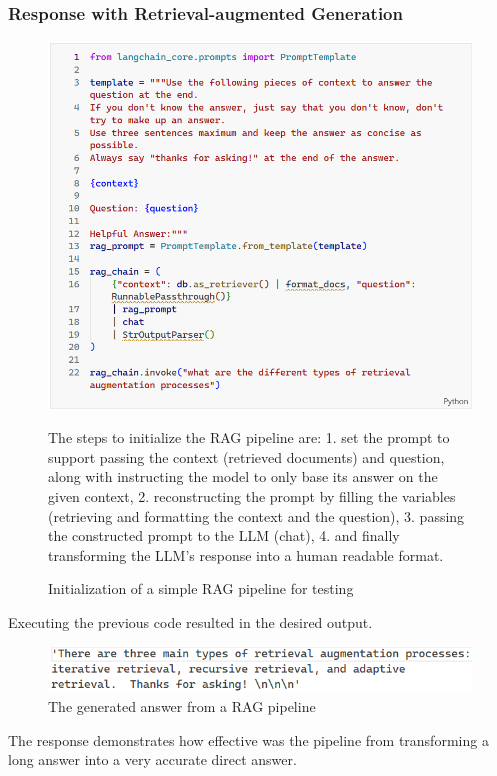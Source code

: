 \subsubsection{Response with Retrieval-augmented Generation}
\begin{figure}[htbp]
    \centering
    \includegraphics[width=.9\linewidth]{./figures/rag-code.png}
    \caption{Initialization of a simple RAG pipeline for testing}
    \begin{flushleft}
        \small The steps to initialize the RAG pipeline are: 1. set the prompt to support passing the context (retrieved documents) and question, along with instructing the model to only base its answer on the given context, 2. reconstructing the prompt by filling the variables (retrieving and formatting the context and the question), 3. passing the constructed prompt to the LLM (chat), 4. and finally transforming the LLM's response into a human readable format.
    \end{flushleft}
\end{figure}\newpage
Executing the previous code resulted in the desired output.
\begin{figure}[htbp]
    \centering
    \includegraphics[width=\linewidth]{./figures/rag-answer.png}
    \caption{The generated answer from a RAG pipeline}
\end{figure}\newline
The response demonstrates how effective was the pipeline from transforming a long answer into a very accurate direct answer.